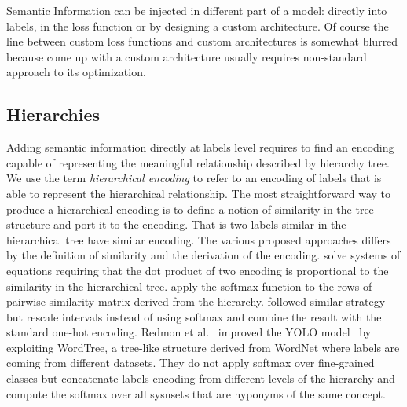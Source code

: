 Semantic Information can be injected in different part of a model: directly into
labels, in the loss function or by designing a custom architecture. Of course
the line between custom loss functions and custom architectures is somewhat
blurred because come up with a custom architecture usually requires
non-standard approach to its optimization.

\subsection{Hierarchies}
\label{subsec:hierarchies}
Adding semantic information directly at labels level requires to find an
encoding capable of representing the meaningful relationship described by
hierarchy tree. We use the term \emph{hierarchical encoding} to refer to an
encoding of labels that is able to represent the hierarchical relationship. The
most straightforward way to produce a hierarchical encoding is to define a
notion of similarity in the tree structure and port it to the encoding. That is
two labels similar in the hierarchical tree have similar encoding. The various
proposed approaches differs by the definition of similarity and the derivation
of the encoding. \cite{HierarchyBasedBarz2018} solve systems of equations
requiring that the dot product of two encoding is proportional to the
similarity in the hierarchical tree. \cite{MakingBetterMBertin2019} apply the
softmax function to the rows of pairwise similarity matrix derived from the
hierarchy. \cite{BeyondOneHotPerott2023} followed similar strategy but rescale
intervals instead of using softmax and combine the result with the standard
one-hot encoding. Redmon et al.~\cite{Yolo9000BetteRedmon2016} improved the
YOLO model~\cite{YouOnlyLookORedmon2015} by exploiting WordTree, a tree-like
structure derived from WordNet where labels are coming from different datasets.
They do not apply softmax over fine-grained classes but concatenate labels
encoding from different levels of the hierarchy and compute the softmax over
all sysnsets that are hyponyms of the same concept.

